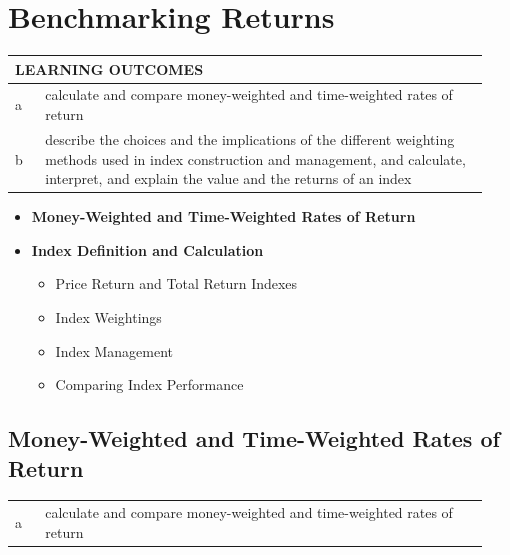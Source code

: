 \chapter{Benchmarking Returns}
\label{chap:Benchmarking Returns}

\begin{center}
\begin{tabular}{p{0.06\linewidth} | p{0.88\linewidth}}
	\toprule
	\multicolumn{2}{l}{\textbf{LEARNING OUTCOMES}} \\
	\midrule
	a & calculate and compare money-weighted and time-weighted rates of return \\
	\midrule
	b & describe the choices and the implications of the different weighting methods used in index construction and management, and calculate, interpret, and explain the value and the returns of an index \\
	\bottomrule
\end{tabular}
\end{center}

\vspace{1.5em}

\begin{itemize}
	\item[] \textbf{Money-Weighted and Time-Weighted Rates of Return}
	\item[] \textbf{Index Definition and Calculation}
	      \begin{itemize}
			\item[] Price Return and Total Return Indexes
			\item[] Index Weightings
			\item[] Index Management
			\item[] Comparing Index Performance
	      \end{itemize}
\end{itemize}

\section{Money-Weighted and Time-Weighted Rates of Return}
\label{sec:Money-Weighted and Time-Weighted Rates of Return}
\begin{center}
\begin{tabular}{p{0.06\linewidth} | p{0.88\linewidth}}
	a & calculate and compare money-weighted and time-weighted rates of return \\
\end{tabular}
\end{center}

